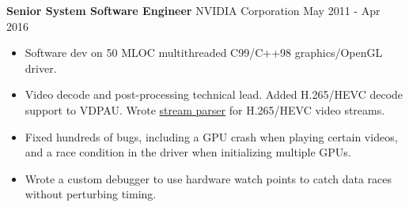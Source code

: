 \textbf{Senior System Software Engineer} NVIDIA Corporation \hfill May 2011 - Apr 2016

\begin{itemize} \itemsep -2pt

\item Software dev on 50 MLOC multithreaded C99/C++98 graphics/OpenGL driver.

\item Video decode and post-processing technical lead. Added H.265/HEVC decode
      support to VDPAU. Wrote
      \href{https://github.com/NVIDIA/vdpau-hevc-example}{stream parser}
      for H.265/HEVC video streams.

\item Fixed hundreds of bugs, including a GPU crash when playing certain videos, and
      a race condition in the driver when initializing multiple GPUs.

\item Wrote a custom debugger to use hardware watch points to catch data races without
      perturbing timing.



\end{itemize}
